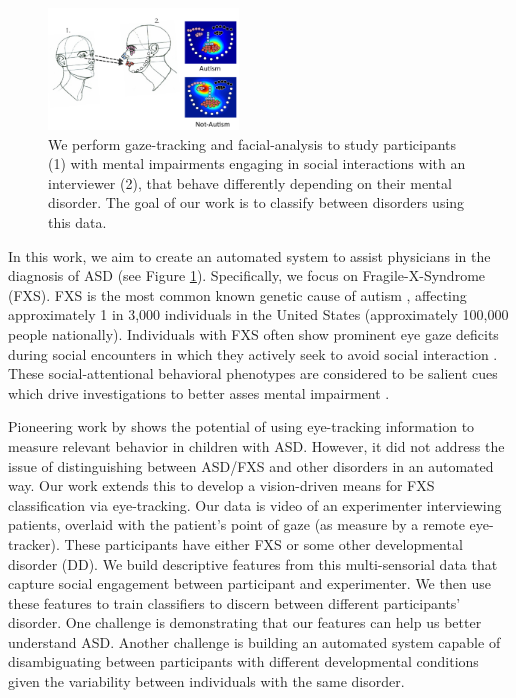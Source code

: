 \documentclass[10pt,twocolumn,letterpaper]{article}
\begin{document}
\begin{figure}[ht]   
\includegraphics[width=0.45\textwidth]{figures/Pull.png}
\caption{We perform gaze-tracking and facial-analysis to study participants (1) with mental impairments engaging in social interactions with an interviewer (2), that behave differently depending on their mental disorder. The goal of our work is to classify between disorders using this data.}
\label{fig:pull_figure}
\end{figure} 

In this work, we aim to create an automated system to assist physicians in the diagnosis of ASD (see Figure \ref{fig:pull_figure}). Specifically, we focus on Fragile-X-Syndrome (FXS). FXS is the most common known genetic cause of autism \cite{Hagerman:2008wg}, affecting approximately 1 in 3,000 individuals in the United States (approximately 100,000 people nationally). Individuals with FXS often show prominent eye gaze deficits during social encounters in which they actively seek to avoid social interaction \cite{Cohen:1988vx,Cohen:1989cm}. These social-attentional behavioral phenotypes are considered to be salient cues which drive investigations to better asses mental impairment \cite{Kennedy:2001dg}. 
   
Pioneering work by \cite{Rehg} shows the potential of using eye-tracking information to measure relevant behavior in children with ASD. However, it did not address the issue of distinguishing between ASD/FXS and other disorders in an automated way. Our work extends this to develop a vision-driven means for FXS classification via eye-tracking. Our data is video of an experimenter interviewing patients, overlaid with the patient's point of gaze (as measure by a remote eye-tracker). These participants have either FXS or some other developmental disorder (DD). We build descriptive features from this multi-sensorial data that capture social engagement between participant and experimenter. We then use these features to train classifiers to discern between different participants' disorder. One challenge is demonstrating that our features can help us better understand ASD. Another challenge is building an automated system capable of disambiguating between participants with different developmental conditions given the variability between individuals with the same disorder. 
\end{document}
